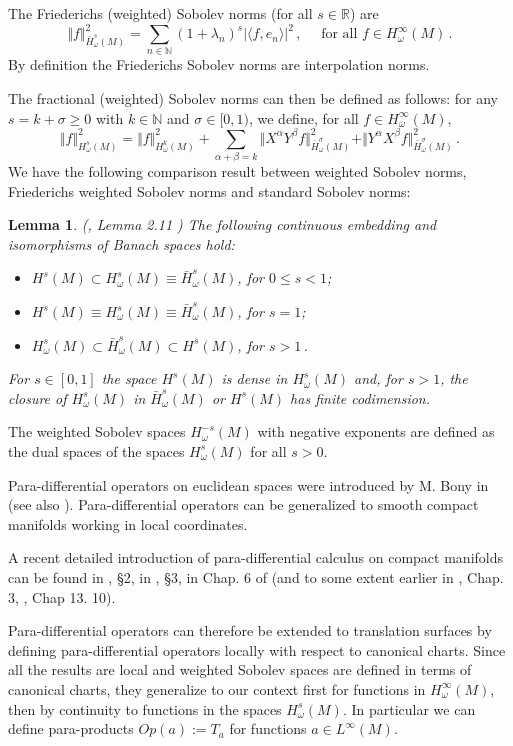 \documentclass[11pt]{amsart}
\newcommand \R {{ \mathbb R}}
\newcommand \N {{ \mathbb N}}
\newtheorem {lemma} [theorem]{Lemma}
\begin{document}
The Friederichs (weighted) Sobolev norms (for all $s \in \R$) are 
$$
\Vert f \Vert _{\bar H^s_\omega(M)}^2 =  \sum_{n\in \N} (1+ \lambda_n)^s \vert \langle f, e_n\rangle\vert^2 \,, \quad \text{ for all } f \in H^\infty_\omega(M)\,.
$$
By definition the Friederichs Sobolev norms are interpolation norms. 

\smallskip
The fractional (weighted) Sobolev norms can then be defined as follows: for any $s= k + \sigma \geq 0$ with $k\in \N$ and $\sigma\in [0, 1)$, we define,
for all $ f \in H^\infty_\omega(M)$, 
$$
\Vert f \Vert_{H^s_\omega(M)}^2 = \Vert f \Vert_{H^{k}_\omega(M)}^2 + \sum_{\alpha + \beta=k}  \Vert X^\alpha Y^\beta f \Vert_{\bar H^{\sigma}_\omega(M)}^2
+ \Vert  Y^\alpha X^\beta f \Vert_{\bar H^{\sigma}_\omega(M)}^2  \,.
$$
We have the following comparison result between weighted Sobolev norms, Friederichs weighted Sobolev norms and standard Sobolev norms:
\begin{lemma} (\cite{F21}, Lemma 2.11 )
The following continuous embedding and isomorphisms of Banach spaces hold:
\begin{itemize}
\item  $H^s(M) \subset  H^s_\omega(M)   \equiv  \bar H^s_\omega(M)$, \qquad for $0\leq s <1$;
\item  $H^s(M) \equiv H^s_\omega(M)   \equiv  \bar H^s_\omega(M)$,  \qquad for $s =1$;
\item $H^s_\omega(M)   \subset  \bar H^s_\omega(M) \subset H^s(M)$,  \qquad for $s>1$\,.
\end{itemize} 
For $s\in [0,1]$ the space $H^s(M)$ is dense in $H^s_\omega(M)$ and, for $s > 1$, the closure of $H^s_\omega(M)$  in $\bar H^s_\omega(M)$ or $H^s(M)$ 
has finite codimension.
\end{lemma}
The weighted Sobolev spaces $H^{-s}_\omega(M)$  with negative exponents 
are defined as the dual spaces of the spaces $H^s_\omega(M)$ for all $s>0$.

\medskip
Para-differential operators on euclidean spaces were introduced by M. Bony in \cite{Bo81}  (see also \cite{Me08}).
Para-differential operators can be generalized to smooth compact manifolds working in local coordinates. 

A recent detailed introduction
of para-differential calculus on compact manifolds can be found in \cite{BGdP21}, \S 2, in \cite{Del15}, \S 3, in Chap. 6 of \cite{Sh22} 
(and to some extent earlier in \cite{Tay91},  Chap. 3, \cite{Tay11}, Chap 13. 10). 

Para-differential operators can therefore be extended to translation surfaces by defining para-differential operators locally with respect to canonical
charts. Since all the results are local and weighted Sobolev spaces are defined in terms of canonical charts, they generalize to our context 
first for functions in $H^\infty_\omega(M)$, then by continuity to functions in the spaces $H^s_\omega(M)$.  
In particular we can define para-products 
$Op(a):=T_a$  for functions $a \in L^\infty (M)$. 
\end{document}
